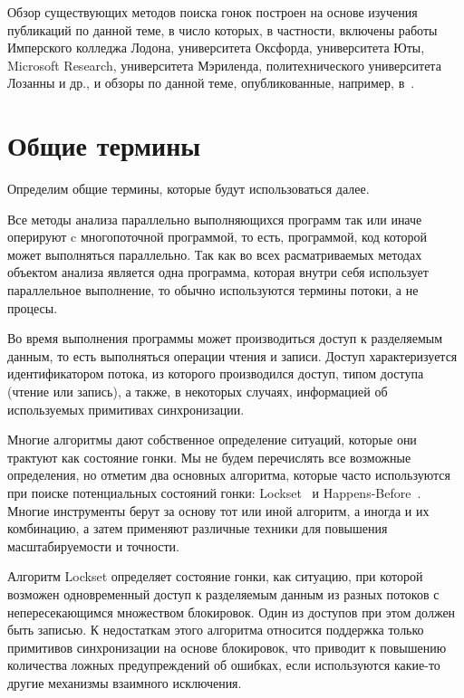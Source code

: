 Обзор существующих методов поиска гонок построен на основе изучения публикаций по данной теме, в число которых, в частности, включены работы Имперского колледжа Лодона, университета Оксфорда, университета Юты, Microsoft Research, университета Мэриленда, политехнического университета Лозанны и др., и обзоры по данной теме, опубликованные, например, в~\cite{raceSurvey,raceSurvey2}.

\section{Общие термины}
\label{rw:common_terms}

Определим общие термины, которые будут использоваться далее.

Все методы анализа параллельно выполняющихся программ так или иначе оперируют c многопоточной программой, то есть, программой, код которой может выполняться параллельно.
Так как во всех расматриваемых методах объектом анализа является одна программа, которая внутри себя использует параллельное выполнение, то обычно используются термины потоки, а не процесы.

Во время выполнения программы может производиться доступ к разделяемым данным, то есть выполняться операции чтения и записи. 
Доступ характеризуется идентификатором потока, из которого производился доступ, типом доступа (чтение или запись), а также, в некоторых случаях, информацией об используемых примитивах синхронизации.

Многие алгоритмы дают собственное определение ситуаций, которые они трактуют как состояние гонки.
Мы не будем перечислять все возможные определения, но отметим два основных алгоритма, которые часто используются при поиске потенциальных состояний гонки: Lockset~\cite{eraser97} и Happens-Before~\cite{Lamport}.
Многие инструменты берут за основу тот или иной алгоритм, а иногда и их комбинацию, а затем применяют различные техники для повышения масштабируемости и точности.

Алгоритм Lockset определяет состояние гонки, как ситуацию, при которой возможен одновременный доступ к разделяемым данным из разных потоков с непересекающимся множеством блокировок.
Один из доступов при этом должен быть записью.
К недостаткам этого алгоритма относится поддержка только примитивов синхронизации на основе блокировок, что приводит к повышению количества ложных предупреждений об ошибках, если используются какие-то другие механизмы взаимного исключения.

